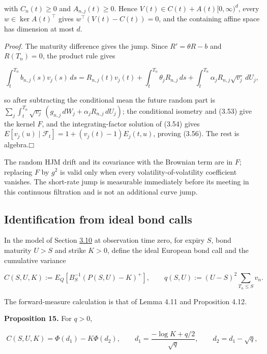 \documentclass[11pt]{article}
\providecommand{\square}{\mdlgwhtsquare}
\begin{document}
with \(C_n(t) \ge 0\) and \(A_{n,j}(t) \ge 0\). Hence \(V(t) \in C(t) + A(t)[0, \infty)^d\), every \(w \in \ker A(t)^\top\) gives \(w^\top (V(t) - C(t)) = 0\), and the containing affine space has dimension at most \(d\).

\emph{Proof.} The maturity difference gives the jump. Since \(R' = \theta R - b\) and \(R(T_n) = 0\), the product rule gives

\begin{equation*}
\int_t^{T_n} b_{n,j}(s) v_j(s)\,ds = R_{n,j}(t) v_j(t) + \int_t^{T_n} \theta_j R_{n,j}\,ds + \int_t^{T_n} \alpha_j R_{n,j} \sqrt{v_j}\,dU_j, \tag{3.58}\label{eq:3.58}
\end{equation*}

so after subtracting the conditional mean the future random part is \(\sum_j \int_t^{T_n} \sqrt{v_j}\,(g_{n,j}\,dW_j + \alpha_j R_{n,j}\,dU_j)\); the conditional isometry and (3.53) give the kernel \(F\), and the integrating-factor solution of (3.54) gives \(E[v_j(u) \mid \mathcal F_t] = 1 + (v_j(t) - 1) E_j(t, u)\), proving (3.56). The rest is algebra.\hfill$\square$

The random HJM drift and its covariance with the Brownian term are in \(F\); replacing \(F\) by \(g^2\) is valid only when every volatility-of-volatility coefficient vanishes. The short-rate jump is measurable immediately before its meeting in this continuous filtration and is not an additional curve jump.

\subsection{Identification from ideal bond calls}\label{sec:3.13}

In the model of Section \hyperref[sec:3.10]{3.10} at observation time zero, for expiry \(S\), bond maturity \(U > S\) and strike \(K > 0\), define the ideal European bond call and the cumulative variance

\begin{equation*}
C(S, U, K) := E_Q[B_S^{-1} (P(S, U) - K)^+], \qquad q(S, U) := (U - S)^2 \sum_{T_n \le S} v_n. \tag{3.59}\label{eq:3.59}
\end{equation*}

The forward-measure calculation is that of \cite{fontana2022term} Lemma 4.11 and Proposition 4.12.

\label{res:Proposition-15}
\textbf{Proposition 15.} For \(q > 0\),

\begin{equation*}
C(S, U, K) = \Phi(d_1) - K \Phi(d_2), \qquad d_1 = \frac{-\log K + q/2}{\sqrt q}, \qquad d_2 = d_1 - \sqrt q, \tag{3.60}\label{eq:3.60}
\end{equation*}
\end{document}
